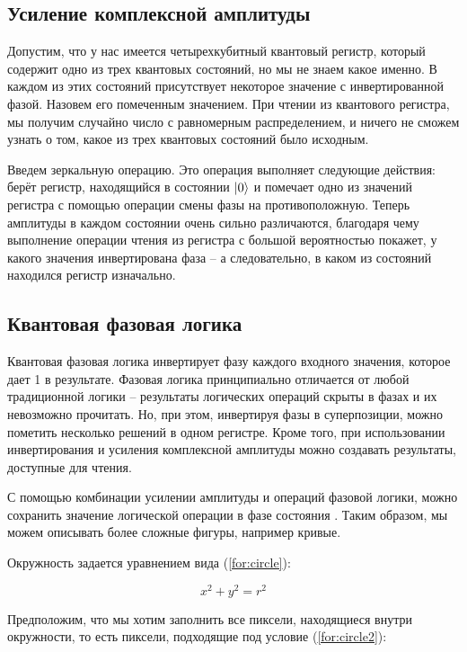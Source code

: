 \subsection{Усиление комплексной амплитуды}

Допустим, что у нас имеется четырехкубитный квантовый регистр, который содержит одно из трех квантовых состояний, но мы не знаем какое именно. В каждом из этих состояний присутствует некоторое значение с инвертированной фазой. Назовем его помеченным значением. При чтении из квантового регистра, мы получим случайно число с равномерным распределением, и ничего не сможем узнать о том, какое из трех квантовых состояний было исходным.

Введем зеркальную операцию. Это операция выполняет следующие действия: берёт регистр, находящийся в состоянии $\lvert0\rangle$ и помечает одно из значений регистра с помощью операции смены фазы на противоположную. Теперь амплитуды в каждом состоянии очень сильно различаются, благодаря чему выполнение операции чтения из регистра с большой вероятностью покажет, у какого значения инвертирована фаза -- а следовательно, в каком из состояний находился регистр изначально.

\subsection{Квантовая фазовая логика}

Квантовая фазовая логика инвертирует фазу каждого входного значения, которое дает 1 в результате.
Фазовая логика принципиально отличается от любой традиционной логики -- результаты логических операций скрыты в фазах и их невозможно прочитать. Но, при этом, инвертируя фазы в суперпозиции, можно пометить несколько решений в одном регистре. Кроме того, при использовании инвертирования и усиления комплексной амплитуды можно создавать результаты, доступные для чтения.

С помощью комбинации усилении амплитуды и операций фазовой логики, можно сохранить значение логической операции в фазе состояния \cite{PQC}. Таким образом, мы можем описывать более сложные фигуры, например кривые.

Окружность задается уравнением вида (\ref{for:circle}):

\begin{equation}
	\label{for:circle}
	x^2 + y^2 = r^2
\end{equation}

Предположим, что мы хотим заполнить все пиксели, находящиеся внутри окружности, то есть пиксели, подходящие под условие (\ref{for:circle2}):

